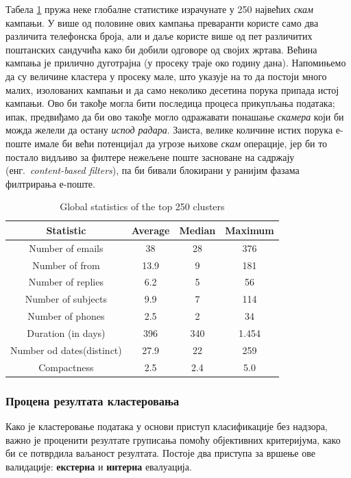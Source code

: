 \documentclass[a4paper]{article}
\begin{document}
Табела \ref{tab:tabela4} пружа неке глобалне статистике израчунате у 250 највећих \emph{скам} кампањи. У више од половине ових кампања преваранти користе само два различита телефонска броја, али и даље користе више од пет различитих поштанских сандучића како би добили одговоре од својих жртава. Већина кампања је прилично дуготрајна (у просеку траје око годину дана). Напомињемо да су величине кластера у просеку мале, што указује на то да постоји много малих, изолованих кампањи и да само неколико десетина порука припада истој кампањи. Ово би такође могла бити последица процеса прикупљања података; ипак, предвиђамо да би ово такође могло одражавати понашање \emph{скамера} који би можда желели да остану \emph{испод радара}. Заиста, велике количине истих порука е-поште имале би већи потенцијал да угрозе њихове \emph{скам} операције, јер би то постало видљиво за филтере нежељене поште засноване на садржају (енг.~{\em content-based filters}), па би бивали блокирани у ранијим фазама филтрирања е-поште. 


\begin{table}[h!]
\begin{center}
\caption{Global statistics of the top 250 clusters}
\begin{tabular}{|c|c|c|c|} \hline
\textbf{Statistic} & \textbf{Average} & \textbf{Median} & \textbf{Maximum} \\ \hline
Number of emails & 38 & 28 & 376\\ \hline
Number of from & 13.9 & 9 & 181\\ \hline
Number of replies & 6.2 & 5 & 56\\ \hline
Number of subjects & 9.9 & 7 & 114\\ \hline
Number of phones & 2.5 & 2 & 34\\ \hline
Duration (in days) & 396 & 340 & 1.454\\ \hline
Number od dates(distinct) & 27.9 & 22 & 259\\ \hline
Compactness & 2.5 & 2.4 & 5.0\\ \hline
\end{tabular}
\label{tab:tabela4}
\end{center}
\end{table}

\subsubsection{Процена резултата кластеровања}
Како је кластеровање података у основи приступ класификације без надзора, важно је проценити резултате груписања помоћу објективних критеријума, како би се потврдила ваљаност резултата. Постоје два приступа за вршење ове валидације: \textbf{екстерна} и \textbf{интерна} евалуација.
\end{document}
